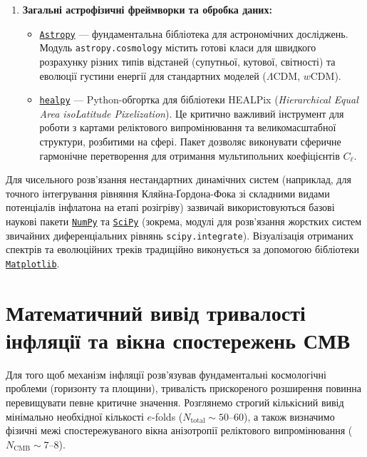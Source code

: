 \documentclass[12pt, a4paper]{article}
\begin{document}
\begin{enumerate}[leftmargin=*]
    \item \textbf{Загальні астрофізичні фреймворки та обробка даних:}
    \begin{itemize}
        \item \href{https://www.astropy.org/}{\texttt{Astropy}} --- фундаментальна бібліотека для астрономічних досліджень. Модуль \texttt{astropy.cosmology} містить готові класи для швидкого розрахунку різних типів відстаней (супутньої, кутової, світності) та еволюції густини енергії для стандартних моделей ($\Lambda\text{CDM}$, $w\text{CDM}$).
        \item \href{https://healpy.readthedocs.io/}{\texttt{healpy}} --- Python-обгортка для бібліотеки HEALPix (\emph{Hierarchical Equal Area isoLatitude Pixelization}). Це критично важливий інструмент для роботи з картами реліктового випромінювання та великомасштабної структури, розбитими на сфері. Пакет дозволяє виконувати сферичне гармонічне перетворення для отримання мультипольних коефіцієнтів $C_\ell$.
    \end{itemize}
\end{enumerate}

Для чисельного розв'язання нестандартних динамічних систем (наприклад, для точного інтегрування рівняння Кляйна-Ґордона-Фока зі складними видами потенціалів інфлатона на етапі розігріву) зазвичай використовуються базові наукові пакети \href{https://numpy.org/}{\texttt{NumPy}} та \href{https://scipy.org/}{\texttt{SciPy}} (зокрема, модулі для розв'язання жорстких систем звичайних диференціальних рівнянь \texttt{scipy.integrate}). Візуалізація отриманих спектрів та еволюційних треків традиційно виконується за допомогою бібліотеки \href{https://matplotlib.org/}{\texttt{Matplotlib}}.

\appendix
\section{Математичний вивід тривалості інфляції та вікна спостережень СМВ}
\label{sec:appendix_efolds}

Для того щоб механізм інфляції розв'язував фундаментальні космологічні проблеми (горизонту та площини), тривалість прискореного розширення повинна перевищувати певне критичне значення. Розглянемо строгий кількісний вивід мінімально необхідної кількості $e$-folds ($N_{\mathrm{total}} \sim 50$--$60$), а також визначимо фізичні межі спостережуваного вікна анізотропії реліктового випромінювання ($N_{\mathrm{CMB}} \sim 7$--$8$).
\end{document}
